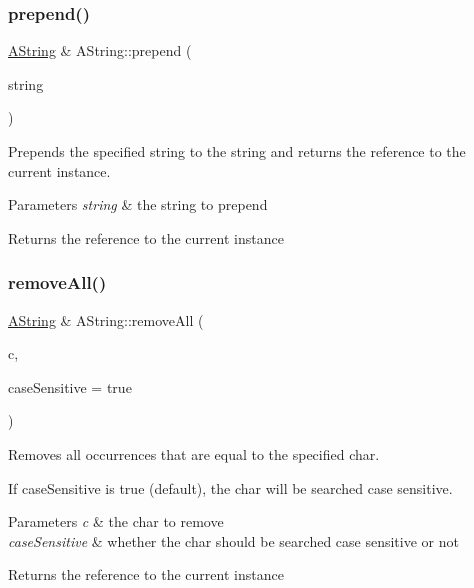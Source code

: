 \subsubsection{\texorpdfstring{prepend()}{prepend()}\hspace{0.1cm}{\footnotesize\ttfamily [2/2]}}
{\footnotesize\ttfamily \mbox{\hyperlink{class_a_string}{A\+String}} \& A\+String\+::prepend (\begin{DoxyParamCaption}\item[{const \mbox{\hyperlink{class_a_string}{A\+String}} \&}]{string }\end{DoxyParamCaption})}



Prepends the specified string to the string and returns the reference to the current instance. 


\begin{DoxyParams}{Parameters}
{\em string} & the string to prepend \\
\hline
\end{DoxyParams}
\begin{DoxyReturn}{Returns}
the reference to the current instance 
\end{DoxyReturn}
\mbox{\label{class_a_string_aa5449e9044b69fa7987139d32981b374}} 
\subsubsection{\texorpdfstring{removeAll()}{removeAll()}\hspace{0.1cm}{\footnotesize\ttfamily [1/2]}}
{\footnotesize\ttfamily \mbox{\hyperlink{class_a_string}{A\+String}} \& A\+String\+::remove\+All (\begin{DoxyParamCaption}\item[{char}]{c,  }\item[{bool}]{case\+Sensitive = {\ttfamily true} }\end{DoxyParamCaption})}



Removes all occurrences that are equal to the specified char. 

If case\+Sensitive is true (default), the char will be searched case sensitive.


\begin{DoxyParams}{Parameters}
{\em c} & the char to remove \\
\hline
{\em case\+Sensitive} & whether the char should be searched case sensitive or not \\
\hline
\end{DoxyParams}
\begin{DoxyReturn}{Returns}
the reference to the current instance 
\end{DoxyReturn}
\mbox{\label{class_a_string_a4b4c9d14b53ed0dce8314d7d14755d8b}} 
